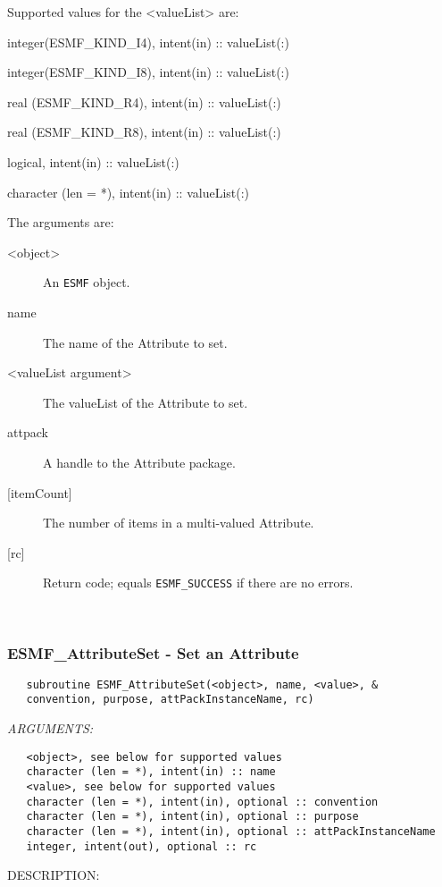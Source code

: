   Supported values for the <valueList> are:
   \begin{description}
   \item integer(ESMF\_KIND\_I4), intent(in) :: valueList(:)
   \item integer(ESMF\_KIND\_I8), intent(in) :: valueList(:)
   \item real (ESMF\_KIND\_R4), intent(in) :: valueList(:)
   \item real (ESMF\_KIND\_R8), intent(in) :: valueList(:)
   \item logical, intent(in) :: valueList(:)
   \item character (len = *), intent(in) :: valueList(:)
   \end{description}
  
   The arguments are:
   \begin{description}
   \item [<object>]
   An {\tt ESMF} object.
   \item [name]
   The name of the Attribute to set.
   \item [<valueList argument>]
   The valueList of the Attribute to set.
   \item [attpack]
   A handle to the Attribute package.
   \item [{[itemCount]}]
   The number of items in a multi-valued Attribute.
   \item [{[rc]}]
   Return code; equals {\tt ESMF\_SUCCESS} if there are no errors.
   \end{description}
  
   
 
\mbox{}\hrulefill\ 
 
\subsubsection [ESMF\_AttributeSet] {ESMF\_AttributeSet - Set an Attribute}


  
\begin{verbatim}   subroutine ESMF_AttributeSet(<object>, name, <value>, &
   convention, purpose, attPackInstanceName, rc)\end{verbatim}{\em ARGUMENTS:}
\begin{verbatim}   <object>, see below for supported values
   character (len = *), intent(in) :: name
   <value>, see below for supported values
   character (len = *), intent(in), optional :: convention
   character (len = *), intent(in), optional :: purpose
   character (len = *), intent(in), optional :: attPackInstanceName
   integer, intent(out), optional :: rc\end{verbatim}
{\sf DESCRIPTION:\\ }



